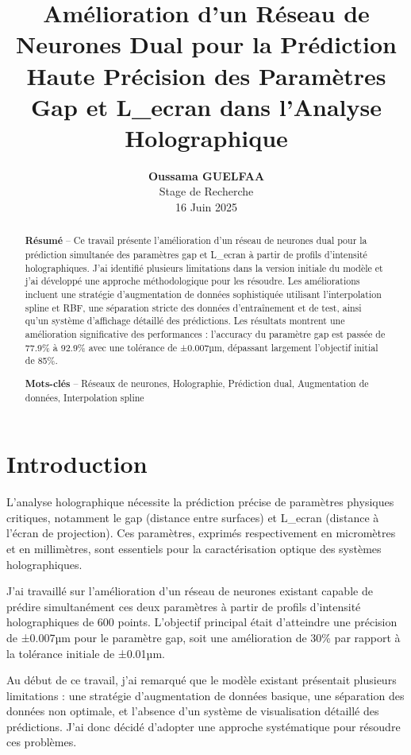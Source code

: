 \documentclass[10pt,twocolumn]{article}
\title{\Large\textbf{Amélioration d'un Réseau de Neurones Dual pour la Prédiction Haute Précision des Paramètres Gap et L\_ecran dans l'Analyse Holographique}}
\author{
    \textbf{Oussama GUELFAA}\\
    \small Stage de Recherche\\
    \small 16 Juin 2025
}
\date{}
\begin{document}
\maketitle

\begin{abstract}
\textbf{Résumé} -- Ce travail présente l'amélioration d'un réseau de neurones dual pour la prédiction simultanée des paramètres gap et L\_ecran à partir de profils d'intensité holographiques. J'ai identifié plusieurs limitations dans la version initiale du modèle et j'ai développé une approche méthodologique pour les résoudre. Les améliorations incluent une stratégie d'augmentation de données sophistiquée utilisant l'interpolation spline et RBF, une séparation stricte des données d'entraînement et de test, ainsi qu'un système d'affichage détaillé des prédictions. Les résultats montrent une amélioration significative des performances : l'accuracy du paramètre gap est passée de 77.9\% à 92.9\% avec une tolérance de ±0.007µm, dépassant largement l'objectif initial de 85\%.

\textbf{Mots-clés} -- Réseaux de neurones, Holographie, Prédiction dual, Augmentation de données, Interpolation spline
\end{abstract}

\section{Introduction}

L'analyse holographique nécessite la prédiction précise de paramètres physiques critiques, notamment le gap (distance entre surfaces) et L\_ecran (distance à l'écran de projection). Ces paramètres, exprimés respectivement en micromètres et en millimètres, sont essentiels pour la caractérisation optique des systèmes holographiques.

J'ai travaillé sur l'amélioration d'un réseau de neurones existant capable de prédire simultanément ces deux paramètres à partir de profils d'intensité holographiques de 600 points. L'objectif principal était d'atteindre une précision de ±0.007µm pour le paramètre gap, soit une amélioration de 30\% par rapport à la tolérance initiale de ±0.01µm.

Au début de ce travail, j'ai remarqué que le modèle existant présentait plusieurs limitations : une stratégie d'augmentation de données basique, une séparation des données non optimale, et l'absence d'un système de visualisation détaillé des prédictions. J'ai donc décidé d'adopter une approche systématique pour résoudre ces problèmes.
\end{document}
